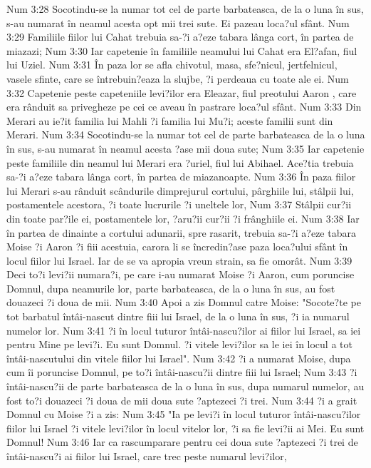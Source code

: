 Num 3:28  Socotindu-se la numar tot cel de parte barbateasca, de la o luna în sus, s-au numarat în neamul acesta opt mii trei sute. Ei pazeau loca?ul sfânt.
Num 3:29  Familiile fiilor lui Cahat trebuia sa-?i a?eze tabara lânga cort, în partea de miazazi;
Num 3:30  Iar capetenie în familiile neamului lui Cahat era El?afan, fiul lui Uziel.
Num 3:31  În paza lor se afla chivotul, masa, sfe?nicul, jertfelnicul, vasele sfinte, care se întrebuin?eaza la slujbe, ?i perdeaua cu toate ale ei.
Num 3:32  Capetenie peste capeteniile levi?ilor era Eleazar, fiul preotului Aaron , care era rânduit sa privegheze pe cei ce aveau în pastrare loca?ul sfânt.
Num 3:33  Din Merari au ie?it familia lui Mahli ?i familia lui Mu?i; aceste familii sunt din Merari.
Num 3:34  Socotindu-se la numar tot cel de parte barbateasca de la o luna în sus, s-au numarat în neamul acesta ?ase mii doua sute;
Num 3:35  Iar capetenie peste familiile din neamul lui Merari era ?uriel, fiul lui Abihael. Ace?tia trebuia sa-?i a?eze tabara lânga cort, în partea de miazanoapte.
Num 3:36  În paza fiilor lui Merari s-au rânduit scândurile dimprejurul cortului, pârghiile lui, stâlpii lui, postamentele acestora, ?i toate lucrurile ?i uneltele lor,
Num 3:37  Stâlpii cur?ii din toate par?ile ei, postamentele lor, ?aru?ii cur?ii ?i frânghiile ei.
Num 3:38  Iar în partea de dinainte a cortului adunarii, spre rasarit, trebuia sa-?i a?eze tabara Moise ?i Aaron ?i fiii acestuia, carora li se încredin?ase paza loca?ului sfânt în locul fiilor lui Israel. Iar de se va apropia vreun strain, sa fie omorât.
Num 3:39  Deci to?i levi?ii numara?i, pe care i-au numarat Moise ?i Aaron, cum poruncise Domnul, dupa neamurile lor, parte barbateasca, de la o luna în sus, au fost douazeci ?i doua de mii.
Num 3:40  Apoi a zis Domnul catre Moise: "Socote?te pe tot barbatul întâi-nascut dintre fiii lui Israel, de la o luna în sus, ?i ia numarul numelor lor.
Num 3:41  ?i în locul tuturor întâi-nascu?ilor ai fiilor lui Israel, sa iei pentru Mine pe levi?i. Eu sunt Domnul. ?i vitele levi?ilor sa le iei în locul a tot întâi-nascutului din vitele fiilor lui Israel".
Num 3:42  ?i a numarat Moise, dupa cum îi poruncise Domnul, pe to?i întâi-nascu?ii dintre fiii lui Israel;
Num 3:43  ?i întâi-nascu?ii de parte barbateasca de la o luna în sus, dupa numarul numelor, au fost to?i douazeci ?i doua de mii doua sute ?aptezeci ?i trei.
Num 3:44  ?i a grait Domnul cu Moise ?i a zis:
Num 3:45  "Ia pe levi?i în locul tuturor întâi-nascu?ilor fiilor lui Israel ?i vitele levi?ilor în locul vitelor lor, ?i sa fie levi?ii ai Mei. Eu sunt Domnul!
Num 3:46  Iar ca rascumparare pentru cei doua sute ?aptezeci ?i trei de întâi-nascu?i ai fiilor lui Israel, care trec peste numarul levi?ilor,
